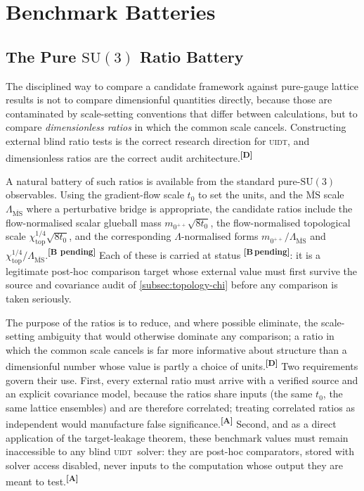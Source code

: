 \documentclass[12pt,a4paper,twoside]{article}
\theoremstyle{plain}
\theoremstyle{definition}
\theoremstyle{remark}
\newcommand{\UIDT}{\textsc{uidt}}
\newcommand{\catmark}[1]{\textsuperscript{\textsf{\textbf{[#1]}}}}
\newcommand{\Bpending}{\catmark{B\,pending}}
\begin{document}
\newpage
\section{Benchmark Batteries}
\label{sec:benchmark-batteries}

\subsection{The Pure \texorpdfstring{$\mathrm{SU}(3)$}{SU(3)} Ratio Battery}
\label{subsec:ratio-battery}

The disciplined way to compare a candidate framework against pure-gauge lattice results is not to compare dimensionful quantities directly, because those are contaminated by scale-setting conventions that differ between calculations, but to compare \emph{dimensionless ratios} in which the common scale cancels. Constructing external blind ratio tests is the correct research direction for \UIDT, and dimensionless ratios are the correct audit architecture.\catmark{D}

A natural battery of such ratios is available from the standard pure-$\mathrm{SU}(3)$ observables. Using the gradient-flow scale $t_0$ to set the units, and the $\overline{\mathrm{MS}}$ scale $\Lambda_{\overline{\mathrm{MS}}}$ where a perturbative bridge is appropriate, the candidate ratios include the flow-normalised scalar glueball mass $m_{0^{++}}\sqrt{8t_0}$, the flow-normalised topological scale $\chi_{\mathrm{top}}^{1/4}\sqrt{8t_0}$, and the corresponding $\Lambda$-normalised forms $m_{0^{++}}/\Lambda_{\overline{\mathrm{MS}}}$ and $\chi_{\mathrm{top}}^{1/4}/\Lambda_{\overline{\mathrm{MS}}}$.\catmark{B pending} Each of these is carried at status \Bpending: it is a legitimate post-hoc comparison target whose external value must first survive the source and covariance audit of \cref{subsec:topology-chi} before any comparison is taken seriously.

The purpose of the ratios is to reduce, and where possible eliminate, the scale-setting ambiguity that would otherwise dominate any comparison; a ratio in which the common scale cancels is far more informative about structure than a dimensionful number whose value is partly a choice of units.\catmark{D} Two requirements govern their use. First, every external ratio must arrive with a verified source and an explicit covariance model, because the ratios share inputs (the same $t_0$, the same lattice ensembles) and are therefore correlated; treating correlated ratios as independent would manufacture false significance.\catmark{A} Second, and as a direct application of the target-leakage theorem, these benchmark values must remain inaccessible to any blind \UIDT\ solver: they are post-hoc comparators, stored with solver access disabled, never inputs to the computation whose output they are meant to test.\catmark{A}
\end{document}
